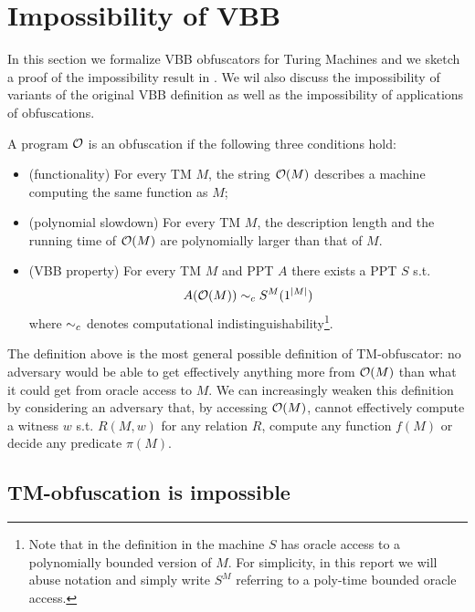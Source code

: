 \section{Impossibility of VBB}

In this section we formalize VBB obfuscators for Turing Machines and we sketch a proof of the impossibility result in \cite{VBB-imp}. We wil also discuss the impossibility of variants of the original VBB definition as well as the impossibility of applications of obfuscations.

\begin{comment}
In this section:
- definition of VBB
- sketch proof
\end{comment}

\begin{mydef}[TM-obfuscator]
	A program $\mathcal{O}$ is an obfuscation if the following three conditions hold: %
	\begin{itemize}
		\item (functionality) For every TM $M$, the string $\mathcal{O}(M)$ describes a machine computing the same function as $M$;
		\item (polynomial slowdown)  For every TM $M$, the description length and the running time of $\mathcal{O}(M)$ are polynomially larger than that of $M$.
		\item (VBB property) For every TM $M$ and PPT $A$ there exists a PPT $S$ s.t. 
		$$ A(\mathcal{O}(M)) \sim_c S^M(1^{|M|}) $$
		where $\sim_c$ denotes computational indistinguishability\footnote{Note that in the definition in \cite{VBB-imp} the machine $S$ has oracle access to a polynomially bounded version of $M$. For simplicity, in this report we will abuse notation and simply write $S^M$ referring to a poly-time bounded oracle access. }.
	\end{itemize}
\end{mydef}

The definition above is the most general possible definition of TM-obfuscator: no adversary would be able to get effectively anything more from $\mathcal{O}(M)$ than what it could get from oracle access to $M$. We can increasingly weaken this definition by considering an adversary that, by accessing $\mathcal{O}(M)$, cannot effectively compute a witness $w$ s.t. $R(M,w)$ for any relation $R$, compute any function $f(M)$ or decide any predicate $\pi(M)$.



\subsection{TM-obfuscation is impossible}


